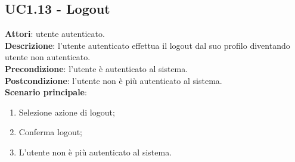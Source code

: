 \subsection{UC1.13 - Logout}{
	\label{uc1.13}
	\textbf{Attori}: utente autenticato.\\
	\textbf{Descrizione}: l'utente autenticato effettua il logout dal suo profilo diventando utente non autenticato.\\
	\textbf{Precondizione}: l'utente è autenticato al sistema.\\
	\textbf{Postcondizione}: l'utente non è più autenticato al sistema.\\
	\textbf{Scenario principale}:
	\begin{enumerate}
		\item Selezione azione di logout;
		\item Conferma logout;
		\item L'utente non è più autenticato al sistema.
	\end{enumerate}
}